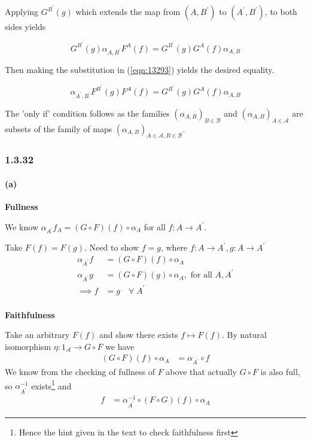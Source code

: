 \documentclass{article}
\begin{document}
Applying $G^{B^{\prime}}(g)$ which extends the map from $(A,B^\prime)$ to $(A^\prime,B^\prime)$, to both sides yields

\begin{equation*}
  G^{B^{\prime}}(g)\alpha_{A, B^\prime}F^A(f) = G^{B^{\prime}}(g)G^A(f)\alpha_{A,B}
\end{equation*}

Then making the substitution in (\ref{eqn:13293}) yields the desired equality.

\begin{equation*}
  \alpha_{A^{\prime},B^{\prime}}F^{B^{\prime}}(g)F^A(f) = G^{B^{\prime}}(g)G^A(f)\alpha_{A,B}
\end{equation*}

The 'only if' condition follows as the families $(\alpha_{A,B})_{B \in \mathcal{B}}$ and $(\alpha_{A,B})_{A \in \mathcal{A}}$ are subsets of the family of maps $(\alpha_{A,B})_{A\in \mathcal{A}, B \in \mathcal{B}}$.

\subsubsection*{1.3.32}

\paragraph{(a)}

\textbf{Fullness}

We know $\alpha_{A^\prime}f_A = (G \circ F)(f) \circ \alpha_A$  for all $ f\colon A \rightarrow A^\prime$.

Take $F(f) = F(g)$. Need to show $f=g$, where $f\colon A \rightarrow A^\prime, g\colon A \rightarrow A^\prime$
\begin{align*}
  \alpha_{A^\prime}f &= (G \circ F)(f) \circ \alpha_{A}\\
  \alpha_{A^\prime}g &= (G \circ F)(g) \circ \alpha_{A}, \text{ for all } A, A^\prime\\
  \implies f &= g \quad \forall \; A^\prime \\
\end{align*}

\textbf{Faithfulness}

Take an arbitrary $F(f)$ and show there exists $f \mapsto F(f)$. By natural isomorphism $\eta : 1_\mathcal{A} \rightarrow G \circ F$ we have
\begin{align*}
  (G\circ F)(f) \circ \alpha_A &= \alpha_{A^\prime} \circ f
\end{align*}
We know from the checking of fullness of $F$ above that actually $G \circ F$ is also full, so $\alpha_{A^\prime}^{-1}$ exists\footnote{Hence the hint given in the text to check faithfulness first} and
\begin{align*}
  f &= \alpha_{A^\prime}^{-1} \circ (F \circ G)(f) \circ \alpha_A
\end{align*}
\end{document}
